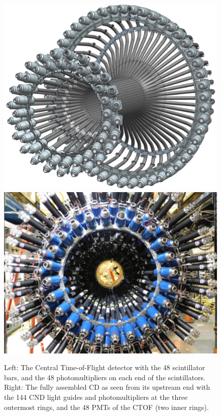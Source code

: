 \documentclass[final,3p,times,twocolumn,authoryear]{elsarticle}
\begin{document}
\begin{figure}[htbp!]
\hspace{-0.3cm}\centerline{\includegraphics[width=1.1\columnwidth]{ctof-design.png}
\hspace{0.3cm}\includegraphics[angle=90,width=0.8\columnwidth]{cnd-ctof.png}}
\caption{Left: The Central Time-of-Flight detector with the 48 scintillator bars, and the 
48 photomultipliers on each end of the scintillators. Right: The fully assembled CD as seen from its upstream 
end with the 144 CND light guides and photomultipliers 
at the three outermost rings, and the 48 PMTs of the CTOF (two inner rings). } 
\label{ctof-cnd}
\end{figure} 
\end{document}
